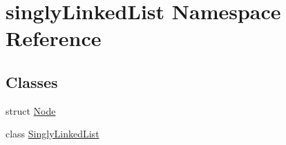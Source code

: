 \hypertarget{namespacesinglyLinkedList}{\section{singly\-Linked\-List Namespace Reference}
\label{namespacesinglyLinkedList}
}
\subsection*{Classes}
\begin{DoxyCompactItemize}
\item 
struct \hyperlink{structsinglyLinkedList_1_1Node}{Node}
\item 
class \hyperlink{classsinglyLinkedList_1_1SinglyLinkedList}{Singly\-Linked\-List}
\end{DoxyCompactItemize}
